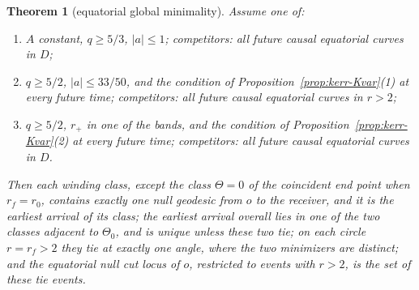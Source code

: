 \documentclass[aip,jmp,amsmath,amssymb,reprint]{revtex4-2}
\theoremstyle{plain}
\newtheorem{theorem}{Theorem}
\theoremstyle{definition}
\begin{document}
\begin{theorem}[equatorial global minimality]\label{thm:kerr-eq}
Assume one of:
\begin{enumerate}
\item[(i)] $A$ constant, $q\ge5/3$, $|a|\le1$; competitors: all future causal equatorial curves in $D$;
\item[(ii)] $q\ge5/2$, $|a|\le33/50$, and the condition of Proposition~\ref{prop:kerr-Kvar}(1) at every
  future time; competitors: all future causal equatorial curves in $r>2$;
\item[(iii)] $q\ge5/2$, $r_+$ in one of the bands, and the condition of
  Proposition~\ref{prop:kerr-Kvar}(2) at every future time; competitors: all future causal equatorial
  curves in $D$.
\end{enumerate}
Then each winding class, except the class $\Theta=0$ of the coincident end point when $r_f=r_0$, contains exactly
one null geodesic from $o$ to the receiver, and it is the
earliest arrival of its class; the earliest arrival overall lies in one of the two classes
adjacent to $\Theta_0$, and is unique unless these two tie; on each circle $r=r_f>2$ they tie at exactly
one angle, where the two minimizers are distinct; and the equatorial null cut locus of $o$,
restricted to events with $r>2$, is the set of these tie events.
\end{theorem}
\end{document}
